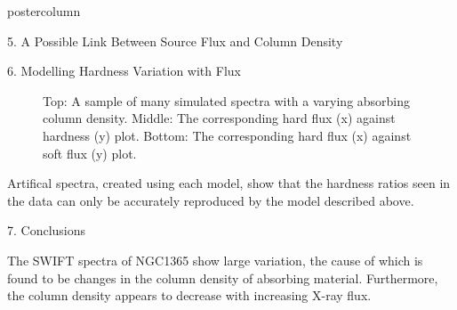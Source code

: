 \documentclass[final]{beamer}
\begin{document}
\begin{frame}
\begin{columns}
\begin{column}{.5\textwidth}
\begin{beamercolorbox}[center,wd=\textwidth]{postercolumn}
\begin{minipage}[T]{.97\textwidth}
{\begin{block}{5. A Possible Link Between Source Flux and Column Density}
        \end{block}            

	        
	  \vspace{30pt}  
         
         
         
	
         \vspace{10pt}

         \begin{block}{6. Modelling Hardness Variation with Flux}   
            
		\begin{figure}
			\caption{Top: A sample of many simulated spectra with a
				varying absorbing column density. Middle: The 
				corresponding hard flux (x) against hardness (y) plot. 
				Bottom: The corresponding hard flux (x) against soft 
				flux (y) plot.}
  			\end{figure}
  				
		Artifical spectra, created using each model,
		show that the hardness ratios seen in the data can only be accurately
		reproduced by the model described above. 
				
         \end{block}  
          
         \vspace{40pt}   



	\begin{block}{7. Conclusions}
				
		The SWIFT spectra of NGC1365 show large variation, the cause of which
		is found to be changes in the column density of absorbing material.
		Furthermore, the column density appears to decrease with increasing X-ray flux. 
		
		
	\end{block}

         \vspace{40pt} 

}
\end{minipage}
\end{beamercolorbox}
\end{column}
\end{columns}
\end{frame}
\end{document}
